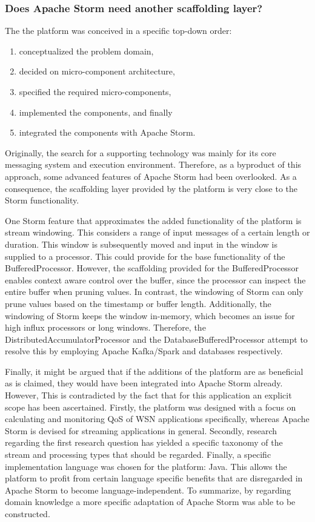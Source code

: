 \subsubsection{Does Apache Storm need another scaffolding layer?}
The the platform was conceived in a specific top-down order:
\begin{enumerate}
\nospace
\item conceptualized the problem domain,
\item decided on micro-component architecture,
\item specified the required micro-components,
\item implemented the components, and finally
\item integrated the components with Apache Storm.
\end{enumerate}
Originally, the search  for a supporting technology was mainly for its core messaging system and execution environment. Therefore, as a byproduct of this approach, some advanced features of Apache Storm had been overlooked. As a consequence, the scaffolding layer provided by the platform is very close to the Storm functionality.

One Storm feature that approximates the added functionality of the platform is stream windowing. This considers a range of input messages of a certain length or duration. This window is subsequently moved and input in the window is supplied to a processor. This could provide for the base functionality of the BufferedProcessor. However, the scaffolding provided for the BufferedProcessor enables context aware control over the buffer, since the processor can inspect the entire buffer when pruning values. In contrast, the windowing of Storm  can only prune values based on the timestamp or buffer length. Additionally, the windowing of Storm keeps the window in-memory, which becomes an issue for high influx processors or long windows. Therefore, the DistributedAccumulatorProcessor and the DatabaseBufferedProcessor attempt to resolve this by employing Apache Kafka/Spark and databases respectively.

Finally, it might be argued that if the additions of the platform are as beneficial as is claimed, they would have been integrated into Apache Storm already. However, This is contradicted by the fact that for this application an explicit scope has been ascertained. Firstly, the platform was designed with a focus on calculating and monitoring QoS of WSN applications specifically, whereas Apache Storm is devised for streaming applications in general. Secondly, research regarding the first research question has yielded a specific taxonomy of the stream and processing types that should be regarded. Finally, a specific implementation language was chosen for the platform: Java. This allows the platform to profit from certain language specific benefits that are disregarded in Apache Storm to become language-independent. To summarize, by regarding domain knowledge a more specific adaptation of Apache Storm was able to be constructed.
		
